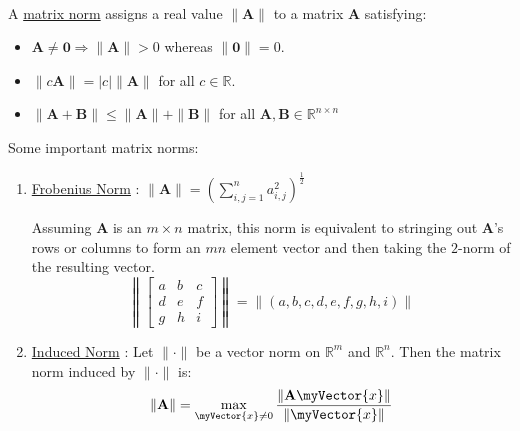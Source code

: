 \documentclass{book}
\newcommand{\teachComment}{
   \color{Orange}%
   \fontsize{12}{14}\selectfont%
}
\newenvironment{myTindent}{%
   \begin{adjustwidth}{7.5em}{0em}%
}{%
   \end{adjustwidth}%
}
\newcommand{\udefine}[1]{%
   {\setulcolor{Red}%
   \setul{0.14em}{0.07em}%
   \ul{#1}}%
}
\newcommand{\mySepTwo}[1][.]{%
   {\noindent\color{#1}{\rule{6.5in}{0.5mm}}}\\%
}
\newcommand{\retTwo}{\hfill\bigbreak}
\newcommand{\mVec}[1]{\myVector{#1}}
\newcommand{\mMat}[1]{\mathbf{#1}}
\begin{document}
   \mySepTwo

   A \udefine{matrix norm} assigns a real value $\|\mMat{A}\|$ to a matrix $\mMat{A}$ satisfying:
   \begin{itemize}
      \item $\mMat{A} \neq \mMat{0} \Longrightarrow \|\mMat{A}\| > 0$ whereas $\| \mMat{0} \| = 0$.
      \item $\| c\mMat{A} \| = \lvert c \rvert \| \mMat{A} \|$ for all $c \in \mathbb{R}$.
      \item $\|\mMat{A}+\mMat{B}\| \leq \|\mMat{A}\| + \|\mMat{B}\|$ for all $\mMat{A}, \mMat{B} \in \mathbb{R}^{n\times n}$
   \end{itemize} \retTwo

   Some important matrix norms:
   \begin{enumerate}
      \item \udefine{Frobenius Norm}: $\| \mMat{A} \| = \left({\displaystyle\sum_{i,j=1}^n{a_{i,j}^2}}\right)^\frac{1}{2}$
      {\begin{myTindent} \teachComment
         Assuming $\mMat{A}$ is an $m\times n$ matrix, this norm is equivalent to stringing out $\mMat{A}$'s rows or columns to form an $mn$ element vector and then taking the $2$-norm of the resulting vector.
         \[
         \left\|\begin{bmatrix}
            a & b & c \\ d & e & f \\ g & h & i
         \end{bmatrix}\right\| = \left\|(a, b, c, d, e, f, g, h, i)\right\|\]
      \end{myTindent}}
      \item \udefine{Induced Norm}: Let $\|\cdot\|$ be a vector norm on $\mathbb{R}^m$ and $\mathbb{R}^n$. Then the matrix norm induced by $\|\cdot \|$ is:  \[\|\mMat{A}\| = \max\limits_{\mVec{x} \neq 0}{\frac{\|\mMat{A}\mVec{x}\|}{\|\mVec{x}\|}}\]
   \end{enumerate}
   \newpage
   
\end{document}
